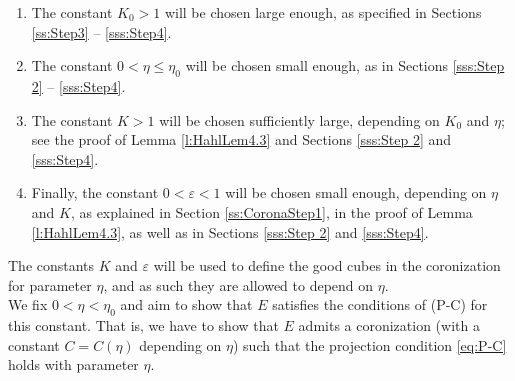 \documentclass[12pt]{amsart}
\numberwithin{equation}{section}
\theoremstyle{plain}
\theoremstyle{definition}
\theoremstyle{remark}
\begin{document}
\begin{enumerate}
\item The constant $K_0>1$ will be chosen large enough, as specified in Sections \ref{ss:Step3} -- \ref{sss:Step4}.
\item The constant $0<\eta\leq \eta_0$ will be chosen small enough, as in Sections \ref{sss:Step 2} %
-- \ref{sss:Step4}.
\item The constant $K>1$ will be chosen sufficiently large, depending on $K_0$ and $\eta$; see the proof of Lemma \ref{l:HahlLem4.3} and Sections \ref{sss:Step 2} and \ref{sss:Step4}. 
\item Finally, the constant $0<\varepsilon<1$ will be chosen small enough, depending on $\eta$ and $K$, as explained in Section \ref{ss:CoronaStep1}, in the proof of Lemma \ref{l:HahlLem4.3}, as well as in Sections \ref{sss:Step 2} and \ref{sss:Step4}.
\end{enumerate}
The constants $K$ and $\varepsilon$ will be used to define the good cubes in the coronization for parameter $\eta$, and as such they are allowed to depend on $\eta$.\\ 
We fix $0<\eta<\eta_0$ and aim to show that $E$ satisfies the conditions of (P-C) for this constant. That is, we have to show that $E$ admits a coronization (with a constant $C=C(\eta)$ depending on $\eta$) such that the projection condition \eqref{eq:P-C} holds with parameter $\eta$.
\end{document}
